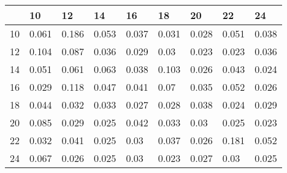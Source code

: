 \begin{table}[!h]
\begin{tabular}{|p{}|p{}|p{}|p{}|p{}|p{}|p{}|p{}|p{}|}
\hline
& 10& 12& 14& 16& 18& 20& 22& 24\\ \hline10 & 0.061& 0.186& 0.053& 0.037& 0.031& 0.028& 0.051& 0.038\\ \hline
12 & 0.104& 0.087& 0.036& 0.029& 0.03& 0.023& 0.023& 0.036\\ \hline
14 & 0.051& 0.061& 0.063& 0.038& 0.103& 0.026& 0.043& 0.024\\ \hline
16 & 0.029& 0.118& 0.047& 0.041& 0.07& 0.035& 0.052& 0.026\\ \hline
18 & 0.044& 0.032& 0.033& 0.027& 0.028& 0.038& 0.024& 0.029\\ \hline
20 & 0.085& 0.029& 0.025& 0.042& 0.033& 0.03& 0.025& 0.023\\ \hline
22 & 0.032& 0.041& 0.025& 0.03& 0.037& 0.026& 0.181& 0.052\\ \hline
24 & 0.067& 0.026& 0.025& 0.03& 0.023& 0.027& 0.03& 0.025\\ \hline
\end{tabular}
\end{table}
